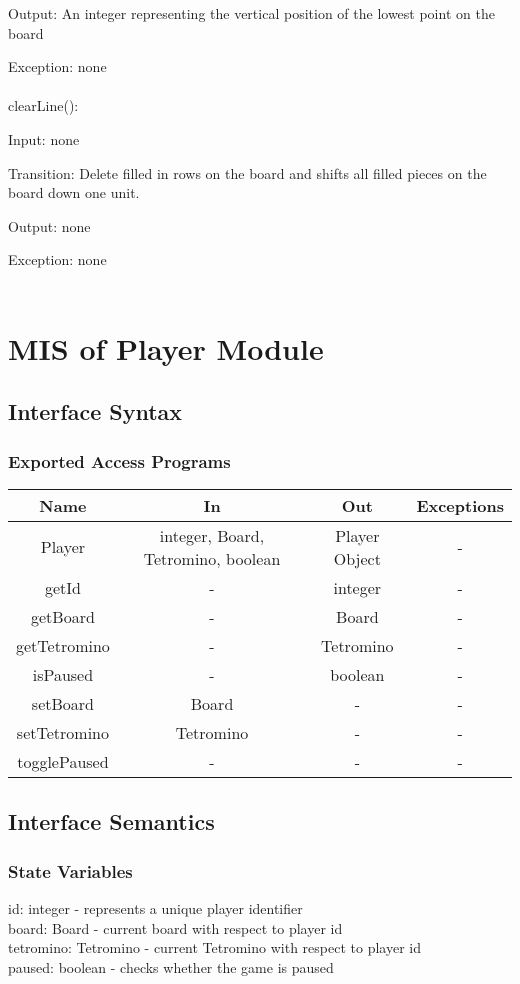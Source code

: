 \documentclass[12,english]{article}
\begin{document}
			Output: An integer representing the vertical position of the lowest point on the board
			
			Exception: none\\
			\\
			clearLine():
			
			Input: none
			
			Transition: Delete filled in rows on the board and shifts all filled pieces on the board down one unit.
			
			Output: none
			
			Exception: none\\
			\\		
\section{MIS of Player Module}
		\subsection{Interface Syntax}
			\subsubsection{Exported Access Programs}
				\begin{tabular}[pos]{|c|c|c|c|}
					
					\hline
					\textbf{Name}& \textbf{In} & \textbf{Out} & \textbf{Exceptions} \\ \hline
					Player & integer, Board, Tetromino, boolean   & Player Object & -\\ \hline
					getId &  - & integer & -\\ \hline
					getBoard &  - & Board & -\\ \hline
					getTetromino &  - & Tetromino & -\\ \hline
					isPaused &  - & boolean & -\\ \hline
					setBoard &  Board & - & -\\ \hline
                    setTetromino &  Tetromino & - & -\\ \hline
                    togglePaused &  - & - & -\\ \hline
                    
 				\end{tabular}
				\label{PlayerEAP}
		\subsection{Interface Semantics}
			\subsubsection{State Variables}
			id: integer - represents a unique player identifier\\ 
			board: Board - current board with respect to player id\\
			tetromino: Tetromino - current Tetromino with respect to player id \\
			paused: boolean - checks whether the game is paused
			
\end{document}
